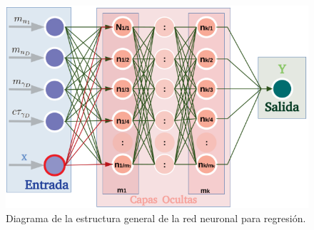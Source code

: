 

\begin{figure}[!t]
\centering
\includegraphics[width=.9\textwidth]{Cap3/imagenes/neuronas.png}
\caption{Diagrama de la estructura general de la red neuronal para regresión.}
\label{neuronas}
\end{figure}

